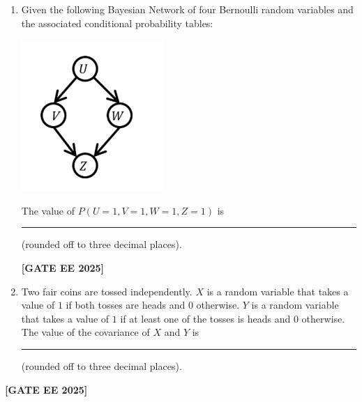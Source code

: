 \documentclass[journal]{IEEEtran}
\newcommand{\qfooter}{%
  \begin{flushright}\footnotesize\textbf{[GATE EE 2025]}\end{flushright}\vspace{1em}%
}
\begin{document}
\begin{enumerate}
\item Given the following Bayesian Network of four Bernoulli random variables and the associated conditional probability tables:

\begin{center}
\includegraphics[width=0.75\columnwidth]{figs/64.png} %
\end{center}

The value of $P(U=1, V=1, W=1, Z=1)$ is \rule{1cm}{0.075mm} (rounded off to three decimal places).
\qfooter


\item Two fair coins are tossed independently. $X$ is a random variable that takes a value of $1$ if both tosses are heads and $0$ otherwise. $Y$ is a random variable that takes a value of $1$ if at least one of the tosses is heads and $0$ otherwise. The value of the covariance of $X$ and $Y$ is \rule{7em}{0.07em} (rounded off to three decimal places).

\end{enumerate} 
\qfooter
\end{document}
